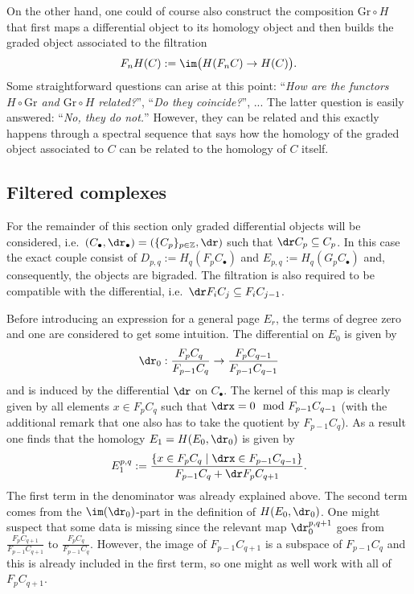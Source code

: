 	On the other hand, one could of course also construct the composition $\mathrm{Gr}\circ H$ that first maps a differential object to its homology object and then builds the graded object associated to the filtration \[F_nH(C):=\im\big(H(F_nC)\rightarrow H(C)\big).\] Some straightforward questions can arise at this point: ``\textit{How are the functors $H\circ\mathrm{Gr}$ and $\mathrm{Gr}\circ H$ related?}'', ``\textit{Do they coincide?}'', ... The latter question is easily answered: ``\textit{No, they do not.}'' However, they can be related and this exactly happens through a spectral sequence that says how the homology of the graded object associated to $C$ can be related to the homology of $C$ itself.

\subsection{Filtered complexes}

	For the remainder of this section only graded differential objects will be considered, i.e.~$(C_\bullet,\dr_\bullet)=(\{C_p\}_{p\in\mathbb{Z}},\dr)$ such that $\dr C_p\subseteq C_p$. In this case the exact couple consist of $D_{p,q}:=H_q(F_pC_\bullet)$ and $E_{p,q}:=H_q(G_pC_\bullet)$ and, consequently, the objects are bigraded. The filtration is also required to be compatible with the differential, i.e.~$\dr F_iC_j\subseteq F_iC_{j-1}$.


	Before introducing an expression for a general page $E_r$, the terms of degree zero and one are considered to get some intuition. The differential on $E_0$ is given by
	\begin{gather}
		\dr_0:\frac{F_pC_q}{F_{p-1}C_q}\rightarrow\frac{F_pC_{q-1}}{F_{p-1}C_{q-1}}
	\end{gather}
	and is induced by the differential $\dr$ on $C_\bullet$. The kernel of this map is clearly given by all elements $x\in F_pC_q$ such that $\drx=0\mod F_{p-1}C_{q-1}$ (with the additional remark that one also has to take the quotient by $F_{p-1}C_q$). As a result one finds that the homology $E_1=H(E_0,\dr_0)$ is given by
	\begin{gather}
		E_1^{p,q}:=\frac{\{x\in F_pC_q\mid\drx\in F_{p-1}C_{q-1}\}}{F_{p-1}C_q+\dr F_pC_{q+1}}.
	\end{gather}
	The first term in the denominator was already explained above. The second term comes from the $\im(\dr_0)$-part in the definition of $H(E_0,\dr_0)$. One might suspect that some data is missing since the relevant map $\dr_0^{p,q+1}$ goes from $\frac{F_pC_{q+1}}{F_{p-1}C_{q+1}}$ to $\frac{F_pC_q}{F_{p-1}C_{q}}$. However, the image of $F_{p-1}C_{q+1}$ is a subspace of $F_{p-1}C_q$ and this is already included in the first term, so one might as well work with all of $F_pC_{q+1}$.

